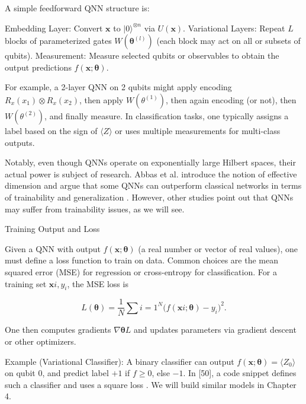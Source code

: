 A simple feedforward QNN structure is:



Embedding Layer: Convert $\mathbf{x}$ to $|0\rangle^{\otimes n}$ via $U(\mathbf{x})$.
Variational Layers: Repeat $L$ blocks of parameterized gates $W(\boldsymbol\theta^{(l)})$ (each block may act on all or subsets of qubits).
Measurement: Measure selected qubits or observables to obtain the output predictions $f(\mathbf{x};\boldsymbol\theta)$.




For example, a 2-layer QNN on 2 qubits might apply encoding $R_x(x_1)\otimes R_x(x_2)$, then apply $W(\theta^{(1)})$, then again encoding (or not), then $W(\theta^{(2)})$, and finally measure. In classification tasks, one typically assigns a label based on the sign of $\langle Z\rangle$ or uses multiple measurements for multi-class outputs.



Notably, even though QNNs operate on exponentially large Hilbert spaces, their actual power is subject of research. Abbas et al. introduce the notion of effective dimension and argue that some QNNs can outperform classical networks in terms of trainability and generalization .  However, other studies point out that QNNs may suffer from trainability issues, as we will see.





Training Output and Loss





Given a QNN with output $f(\mathbf{x};\boldsymbol\theta)$ (a real number or vector of real values), one must define a loss function to train on data. Common choices are the mean squared error (MSE) for regression or cross-entropy for classification.  For a training set ${\mathbf{x}i,y_i}$, the MSE loss is

$$L(\boldsymbol\theta) = \frac{1}{N} \sum{i=1}^N \bigl(f(\mathbf{x}i;\boldsymbol\theta) - y_i\bigr)^2.$$

One then computes gradients $\nabla{\boldsymbol\theta}L$ and updates parameters via gradient descent or other optimizers.



Example (Variational Classifier): A binary classifier can output $f(\mathbf{x};\boldsymbol\theta)=\langle Z_0\rangle$ on qubit 0, and predict label $+1$ if $f\ge0$, else $-1$.  In [50], a code snippet defines such a classifier and uses a square loss .  We will build similar models in Chapter 4.





